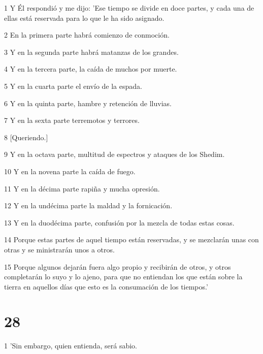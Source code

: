 \par 1 Y Él respondió y me dijo: 'Ese tiempo se divide en doce partes, y cada una de ellas está reservada para lo que le ha sido asignado.

\par 2 En la primera parte habrá comienzo de conmoción.

\par 3 Y en la segunda parte habrá matanzas de los grandes.

\par 4 Y en la tercera parte, la caída de muchos por muerte.

\par 5 Y en la cuarta parte el envío de la espada.

\par 6 Y en la quinta parte, hambre y retención de lluvias.

\par 7 Y en la sexta parte terremotos y terrores.

\par 8 [Queriendo.]

\par 9 Y en la octava parte, multitud de espectros y ataques de los Shedim.

\par 10 Y en la novena parte la caída de fuego.

\par 11 Y en la décima parte rapiña y mucha opresión.

\par 12 Y en la undécima parte la maldad y la fornicación.

\par 13 Y en la duodécima parte, confusión por la mezcla de todas estas cosas.

\par 14 Porque estas partes de aquel tiempo están reservadas, y se mezclarán unas con otras y se ministrarán unos a otros.

\par 15 Porque algunos dejarán fuera algo propio y recibirán de otros, y otros completarán lo suyo y lo ajeno, para que no entiendan los que están sobre la tierra en aquellos días que esto es la consumación de los tiempos.'

\chapter{28}

\par 1 'Sin embargo, quien entienda, será sabio.

